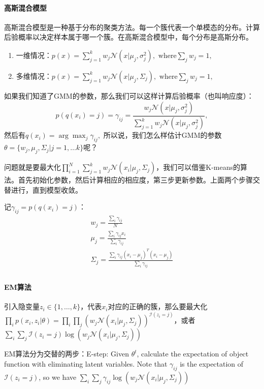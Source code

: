 \paragraph{高斯混合模型}
高斯混合模型是一种基于分布的聚类方法。每一个簇代表一个单模态的分布。计算后验概率以决定样本属于哪一个簇。在高斯混合模型中，每个分布是高斯分布。\begin{enumerate}
    \item 一维情况：$p(x) = \sum_{j=1}^k w_j\mathcal{N}(x|\mu_j, \sigma_j^2),\text{ where} \sum_j w_j = 1,$
    \item 多维情况：$p(x) = \sum_{j=1}^k w_j\mathcal{N}(x|\mu_j, \Sigma_j),\text{ where} \sum_j w_j = 1,$
\end{enumerate}
如果我们知道了GMM的参数，那么我们可以这样计算后验概率（也叫响应度）：
$$p(q(x_i) = j) = \gamma_{ij} = \frac{w_j\mathcal{N}(x|\mu_j, \sigma_j^2)}{\sum_{j=1}^kw_j\mathcal{N}(x|\mu_j, \sigma_j^2)},$$
然后有$q(x_i) = \arg\max_j \gamma_{ij},$
所以说，我们怎么样估计GMM的参数$\theta = \{w_j, \mu_j, \Sigma_j | j = 1, \ldots k\}$呢？

问题就是要最大化$\prod_{i=1}^N \sum_{j=1}^k w_j \mathcal{N}(x_i|\mu_j, \Sigma_j)$，我们可以借鉴K-means的算法。首先初始化参数，然后计算相应的相应度，第三步更新参数。上面两个步骤交替进行，直到模型收敛。

记$\gamma_{ij} = p(q(x_i) = j)$：$$
\begin{aligned}
    w_j = \frac{\sum_i \gamma_{ij}}{N} \\
    \mu_j = \frac{\sum_i \gamma_{ij}x_i}{\sum_i \gamma_{ij}} \\
    \Sigma_j = \frac{\sum_i \gamma_{ij}(x_i - \mu_j)^T(x_i - \mu_j)}{\sum_i \gamma_{ij}} \\
\end{aligned}
$$

\paragraph{EM算法}
引入隐变量$z_i \in \{1, \ldots, k\}$，代表$x_i$对应的正确的簇，那么要最大化$\prod_i p(x_i, z_i|\theta) = \prod_i \prod_j (w_j\mathcal{N}(x_i|\mu_j, \Sigma_j))^{\mathcal{I}(z_i =j)}$，或者$\sum_i \sum_j \mathcal{I}(z_i =j)\log(w_j\mathcal{N}(x_i|\mu_j, \Sigma_j))$

EM算法分为交替的两步：E-step: Given $\theta^t$, calculate the expectation of object function with
eliminating latent variables. Note that $\gamma_{ij}$ is the expectation of $\mathcal{I}(z_i = j)$, so we have $\sum_i\sum_j \gamma_{ij} \log(w_j\mathcal{N}(x_i|\mu_j, \Sigma_j))$

